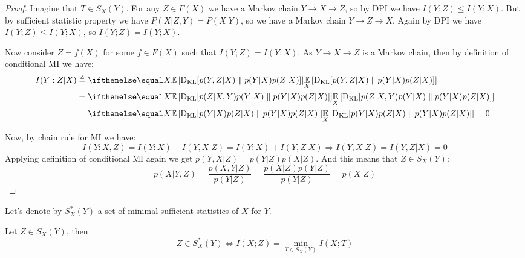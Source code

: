 \documentclass{article}
\begin{document}
\begin{proof}
Imagine that $T \in S_X(Y)$.
For any $Z \in F(X)$ we have a Markov chain $Y \to X \to Z$, so by DPI we have $I(Y;Z) \leq I(Y;X)$.
But by sufficient statistic property we have $P(X|Z,Y) = P(X|Y)$, so we have a Markov chain $Y \to Z \to X$.
Again by DPI we have $I(Y;Z) \leq I(Y;X)$, so $I(Y;Z) = I(Y;X)$.

Now consider $Z = f(X)$ for some $f \in F(X)$ such that $I(Y;Z) = I(Y;X)$.
As $Y \to X \to Z$ is a Markov chain, then by definition of conditional MI we have:
\[
\begin{split}
I(Y:Z|X) &\triangleq \expect[X]{\kl{p(Y,Z|X)}{p(Y|X)p(Z|X)}} \\
&= \expect[X]{\kl{p(Z|X,Y)p(Y|X)}{p(Y|X)p(Z|X)}} \\
&= \expect[X]{\kl{p(Y|X)p(Z|X)}{p(Y|X)p(Z|X)}} = 0
\end{split}
\]

Now, by chain rule for MI we have:
\[
I(Y : X,Z) = I(Y : X) + I(Y,X|Z) = I(Y : X) + I(Y,Z|X) \Longrightarrow I(Y,X|Z) = I(Y,Z|X) = 0
\]
Applying definition of conditional MI again we get $p(Y,X|Z) = p(Y|Z)p(X|Z)$.
And this means that $Z \in S_X(Y)$:
\[
p(X|Y,Z) = \frac{p(X,Y|Z)}{p(Y|Z)} = \frac{p(X|Z) p(Y|Z)}{p(Y|Z)} = p(X|Z)
\]
\end{proof}

Let's denote by $S_X^*(Y)$ a set of minimal sufficient statistics of $X$ for $Y$.
\begin{lemma}
Let $Z \in S_X(Y)$, then
\[
Z \in S_X^*(Y) \Longleftrightarrow I(X;Z) = \min_{T \in S_X(Y)} I(X;T)
\]
\end{lemma}
\end{document}
